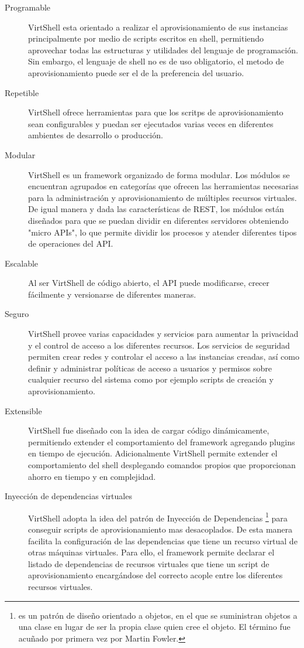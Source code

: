 \begin{description}
\item [Programable] VirtShell esta orientado a realizar el aprovisionamiento de sus instancias principalmente por medio de scripts escritos en shell, permitiendo aprovechar todas las estructuras y utilidades del lenguaje de programación. Sin embargo, el lenguaje de shell no es de uso obligatorio, el  metodo de aprovisionamiento puede ser el de la preferencia del usuario. 
\item [Repetible] VirtShell ofrece herramientas para que los scritps de aprovisionamiento sean configurables y  puedan ser ejecutados varias veces en diferentes ambientes de desarrollo o producción.
\item [Modular] VirtShell es un framework organizado de forma modular. Los módulos se encuentran agrupados en categorías que ofrecen las herramientas necesarias para la administración y aprovisionamiento de múltiples recursos virtuales. De igual manera y dada las características de REST, los módulos están diseñados para que se puedan dividir en diferentes servidores obteniendo "micro APIs", lo que permite dividir los procesos y atender diferentes tipos de operaciones del API. 
\item [Escalable] Al ser VirtShell de código abierto, el API puede modificarse, crecer fácilmente y versionarse de diferentes maneras. 
\item [Seguro] VirtShell provee varias capacidades y servicios para aumentar la privacidad y el control de acceso a los diferentes recursos. Los servicios de seguridad permiten crear redes y controlar el acceso a las instancias creadas, así como definir y administrar políticas de acceso a usuarios y permisos sobre cualquier recurso del sistema como por ejemplo scripts de creación y aprovisionamiento.
\item [Extensible] VirtShell fue diseñado con la idea de cargar código dinámicamente, permitiendo extender el comportamiento del framework agregando plugins en tiempo de ejecución.  Adicionalmente VirtShell permite extender el comportamiento del shell desplegando comandos propios que proporcionan ahorro en tiempo y en complejidad.
\item [Inyección de dependencias virtuales] VirtShell adopta la idea del patrón de Inyección de Dependencias \footnote{es un patrón de diseño orientado a objetos, en el que se suministran objetos a una clase en lugar de ser la propia clase quien cree el objeto. El término fue acuñado por primera vez por Martin Fowler.} \cite{fowler04} para conseguir scripts de aprovisionamiento mas desacoplados. De esta manera facilita la configuración de las dependencias que tiene un recurso virtual de otras máquinas virtuales. Para ello, el framework permite declarar el listado de dependencias de recursos virtuales que tiene un script de aprovisionamiento encargándose del correcto acople entre los diferentes recursos virtuales.

\end{description}
